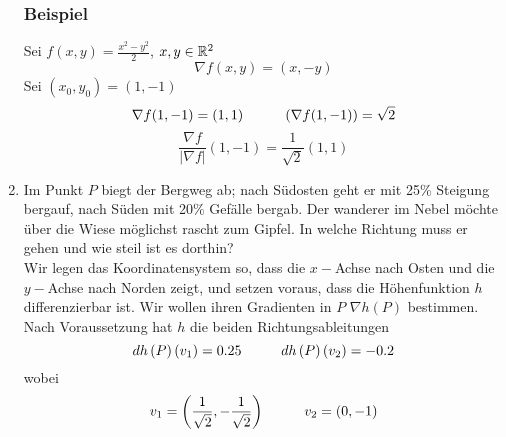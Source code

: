 \begin{enumerate}
\subsubsection*{Beispiel}
Sei $f(x,y)=\frac{x^2-y^2}{2}$, $x,y\in\mathbb{R}^2$ \[\nabla f(x,y)=(x,-y)\] Sei $\left( x_0,y_0\right) = (1,-1)$ \[\nabla f(1,-1)=(1,1)\hspace{10mm} \left( \nabla f(1,-1)\right) = \sqrt{2}\] \[\frac{\nabla f}{\left| \nabla f\right|}(1,-1)=\frac{1}{\sqrt{2}}(1,1)\]
\item Im Punkt $P$ biegt der Bergweg ab; nach Südosten geht er mit 25\% Steigung bergauf, nach Süden mit 20\% Gefälle bergab. Der wanderer im Nebel möchte über die Wiese möglichst rascht zum Gipfel. In welche Richtung muss er gehen und wie steil ist es dorthin?\\

Wir legen das Koordinatensystem so, dass die $x-$Achse nach Osten und die $y-$Achse nach Norden zeigt, und setzen voraus, dass die Höhenfunktion $h$ differenzierbar ist. Wir wollen ihren Gradienten in $P$ $\nabla h(P)$ bestimmen. Nach Voraussetzung hat $h$ die beiden Richtungsableitungen \[dh\left( P\right)\left( v_1\right)=0.25\hspace{10mm}dh\left( P\right)\left(  v_2\right)=-0.2\] wobei \[v_1=\left( \frac{1}{\sqrt{2}},-\frac{1}{\sqrt{2}}\right)\hspace{10mm}v_2=(0,-1)\]

\begin{center}
\end{center}



\end{enumerate}

